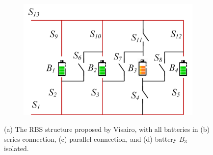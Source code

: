 \documentclass{article}
\begin{document}
\begin{figure}[htbp]
\begin{subfigure}[b]{0.45\textwidth}
        \caption{}
        \label{fig:stru-Visairo-parallel}
    \end{subfigure}
    \hspace{0.05\textwidth}
    \begin{subfigure}[b]{0.45\textwidth}
        \includegraphics[width=\textwidth]{stru-V-isolate.png}
        \caption{}
        \label{fig:stru-Visairo-isolate}
    \end{subfigure}
    \caption{
        (a) The RBS structure proposed by Visairo\cite{visairoReconfigurableBatteryPack2008}, with
        all batteries in (b) series connection, (c) parallel connection, and
        (d) battery $B_3$ isolated.
        }
    \label{fig:arch}
\end{figure}
\end{document}

